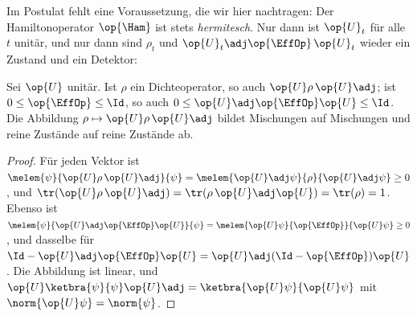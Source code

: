 Im Postulat fehlt eine Voraussetzung, die wir hier nachtragen: Der Hamiltonoperator $\op{\Ham}$ ist
stets \emph{hermitesch}. Nur dann ist $\op{U}_t$ für alle $t$ unitär, und nur dann
sind $\rho_t$ und $\op{U}_t\adj\op{\EffOp}\,\op{U}_t$ wieder ein Zustand und ein Detektor:

\begin{proposition}\label{c04.prop.dynamik}
  Sei $\op{U}$ unitär. Ist $\rho$ ein Dichteoperator, so auch $\op{U}\rho\,\op{U}\adj$; ist
  $0 \leq \op{\EffOp} \leq \Id$, so auch $0 \leq \op{U}\adj\op{\EffOp}\op{U} \leq \Id$. Die Abbildung
  $\rho \mapsto \op{U}\rho\,\op{U}\adj$ bildet Mischungen auf Mischungen und reine Zustände auf reine
  Zustände ab.
\end{proposition}
\begin{proof}
  Für jeden Vektor ist
  $\melem{\psi}{\op{U}\rho\,\op{U}\adj}{\psi} = \melem{\op{U}\adj\psi}{\rho}{\op{U}\adj\psi} \geq 0$,
  und $\tr(\op{U}\rho\,\op{U}\adj) = \tr(\rho\,\op{U}\adj\op{U}) = \tr(\rho) = 1$. Ebenso ist
  $\melem{\psi}{\op{U}\adj\op{\EffOp}\op{U}}{\psi} = \melem{\op{U}\psi}{\op{\EffOp}}{\op{U}\psi} \geq 0$,
  und dasselbe für $\Id - \op{U}\adj\op{\EffOp}\op{U} = \op{U}\adj(\Id - \op{\EffOp})\op{U}$. Die
  Abbildung ist linear, und $\op{U}\ketbra{\psi}{\psi}\op{U}\adj = \ketbra{\op{U}\psi}{\op{U}\psi}$
  mit $\norm{\op{U}\psi} = \norm{\psi}$.
\end{proof}

